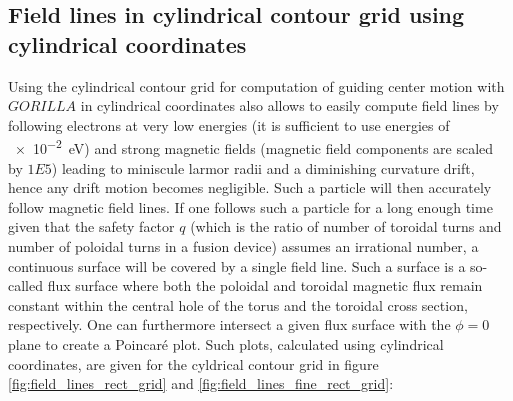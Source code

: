 \documentclass[./main.tex]{subfiles}
\begin{document}
\subsection{Field lines in cylindrical contour grid using cylindrical coordinates}
Using the cylindrical contour grid for computation of guiding center motion with $GORILLA$ in cylindrical coordinates also allows to easily compute field lines by following electrons at very low energies (it is sufficient to use energies of \SI[prefixes-as-symbols=false]{e-2}{eV}) and strong magnetic fields (magnetic field components are scaled by $1E5$) leading to miniscule larmor radii and a diminishing curvature drift, hence any drift motion becomes negligible. Such a particle will then accurately follow magnetic field lines. If one follows such a particle for a long enough time given that the safety factor $q$ (which is the ratio of number of toroidal turns and number of poloidal turns in a fusion device) assumes an irrational number, a continuous surface will be covered by a single field line. Such a surface is a so-called flux surface where both the poloidal and toroidal magnetic flux remain constant within the central hole of the torus and the toroidal cross section, respectively. One can furthermore intersect a given flux surface with the $\phi=0$ plane to create a Poincar\'e plot. Such plots, calculated using cylindrical coordinates, are given for the cyldrical contour grid in figure \ref{fig:field_lines_rect_grid} and \ref{fig:field_lines_fine_rect_grid}:
\end{document}
